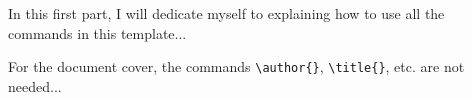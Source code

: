 In this first part, I will dedicate myself to explaining how to use all the commands in this template...

\divider

For the document cover, the commands \verb|\author{}|, \verb|\title{}|, etc. are not needed...

